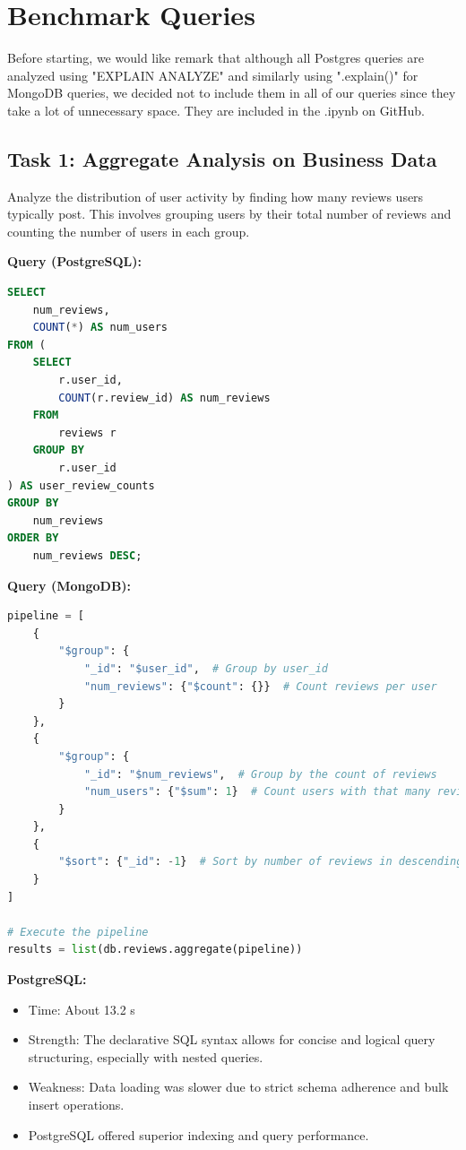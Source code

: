 \documentclass[12pt]{article}
\begin{document}
\section{Benchmark Queries}
Before starting, we would like remark that although all Postgres queries are analyzed using "EXPLAIN ANALYZE" and similarly using ".explain()" for MongoDB queries, we decided not to include them in all of our queries since they take a lot of unnecessary space. They are included in the .ipynb on GitHub.

\subsection*{Task 1: Aggregate Analysis on Business Data}

Analyze the distribution of user activity by finding how many reviews users typically post. This involves grouping users by their total number of reviews and counting the number of users in each group.


\textbf{Query (PostgreSQL):}
\begin{lstlisting}[language=SQL, caption=Aggregate]
SELECT 
    num_reviews,
    COUNT(*) AS num_users
FROM (
    SELECT 
        r.user_id,
        COUNT(r.review_id) AS num_reviews
    FROM 
        reviews r
    GROUP BY 
        r.user_id
) AS user_review_counts
GROUP BY 
    num_reviews
ORDER BY 
    num_reviews DESC;

\end{lstlisting}

\textbf{Query (MongoDB):}
\begin{lstlisting}[language=python]
pipeline = [
    {
        "$group": {
            "_id": "$user_id",  # Group by user_id
            "num_reviews": {"$count": {}}  # Count reviews per user
        }
    },
    {
        "$group": {
            "_id": "$num_reviews",  # Group by the count of reviews
            "num_users": {"$sum": 1}  # Count users with that many reviews
        }
    },
    {
        "$sort": {"_id": -1}  # Sort by number of reviews in descending order
    }
]

# Execute the pipeline
results = list(db.reviews.aggregate(pipeline))
\end{lstlisting}


\textbf{PostgreSQL:}
\begin{itemize}
\item Time: About 13.2 s
\item Strength: The declarative SQL syntax allows for concise and logical query structuring, especially with nested queries.
\item Weakness: Data loading was slower due to strict schema adherence and bulk insert operations.
\item PostgreSQL offered superior indexing and query performance.
\end{itemize}
\end{document}

